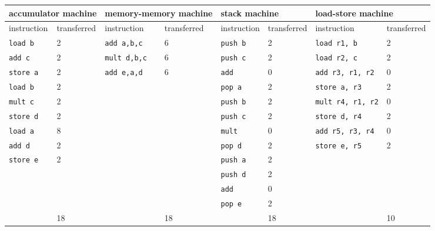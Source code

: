 \documentclass{article}
\begin{document}
\begin{tabular}{l|ll|ll|ll|l|}
\hline
\multicolumn{2}{|l|}{accumulator machine} & \multicolumn{2}{|l|}{memory-memory machine} & \multicolumn{2}{|l|}{stack machine} & \multicolumn{2}{|l|}{load-store machine} \\ \hline
\multicolumn{1}{|l|}{instruction} & transferred & \multicolumn{1}{|l|}{instruction} & transferred & \multicolumn{1}{|l|}{instruction} & transferred & \multicolumn{1}{|l|}{instruction} & transferred \\ \hline
\multicolumn{1}{|l|}{\texttt{load b}} & 2 & \multicolumn{1}{|l|}{\texttt{add a,b,c}} & 6 & \multicolumn{1}{|l|}{\texttt{push b}} & 2 &\multicolumn{1}{|l|}{\texttt{load r1, b}} & 2 \\ 
\multicolumn{1}{|l|}{\texttt{add c}} & 2 &\multicolumn{1}{|l|}{\texttt{mult d,b,c}} & 6 & \multicolumn{1}{|l|}{\texttt{push c}} & 2 & \multicolumn{1}{|l|}{\texttt{load r2, c}} & 2 \\
\multicolumn{1}{|l|}{\texttt{store a}} & 2 & \multicolumn{1}{|l|}{\texttt{add e,a,d}} & 6 & \multicolumn{1}{|l|}{\texttt{add}} & 0 & \multicolumn{1}{|l|}{\texttt{add r3, r1, r2}} & 0\\
\multicolumn{1}{|l|}{\texttt{load b}} & 2 & \multicolumn{1}{|l|}{} & & \multicolumn{1}{|l|}{\texttt{pop a}} & 2 & \multicolumn{1}{|l|}{\texttt{store a, r3}} & 2\\
\multicolumn{1}{|l|}{\texttt{mult c}} & 2 & \multicolumn{1}{|l|}{} & & \multicolumn{1}{|l|}{\texttt{push b}} & 2 & \multicolumn{1}{|l|}{\texttt{mult r4, r1, r2}} & 0 \\
\multicolumn{1}{|l|}{\texttt{store d}} & 2 & \multicolumn{1}{|l|}{} & &\multicolumn{1}{|l|}{\texttt{push c}} & 2 & \multicolumn{1}{|l|}{\texttt{store d, r4}} & 2\\ 
\multicolumn{1}{|l|}{\texttt{load a}} & 8 & \multicolumn{1}{|l|}{} & & \multicolumn{1}{|l|}{\texttt{mult}} & 0 & \multicolumn{1}{|l|}{\texttt{add r5, r3, r4}} & 0 \\
\multicolumn{1}{|l|}{\texttt{add d}} & 2 & \multicolumn{1}{|l|}{} & & \multicolumn{1}{|l|}{\texttt{pop d}} & 2 & \multicolumn{1}{|l|}{\texttt{store e, r5}} & 2\\
\multicolumn{1}{|l|}{\texttt{store e}} & 2 & \multicolumn{1}{|l|}{} & & \multicolumn{1}{|l|}{\texttt{push a}} & 2 & \multicolumn{1}{|l|}{} & \\
\multicolumn{1}{|l|}{} & & \multicolumn{1}{|l|}{} & & \multicolumn{1}{|l|}{\texttt{push d}} & 2 & \multicolumn{1}{|l|}{} & \\ 
\multicolumn{1}{|l|}{} & & \multicolumn{1}{|l|}{} & & \multicolumn{1}{|l|}{\texttt{add}} & 0 & \multicolumn{1}{|l|}{} &\\
\multicolumn{1}{|l|}{} & & \multicolumn{1}{|l|}{} & & \multicolumn{1}{|l|}{\texttt{pop e}} & 2 & \multicolumn{1}{|l|}{} &\\
\hline
 & \multicolumn{1}{|l|}{18} & & \multicolumn{1}{|l|}{18} & & \multicolumn{1}{|l|}{18} & & \multicolumn{1}{|l|}{10} \\
 \cline{2-2}\cline{4-4}\cline{6-6}\cline{8-8}
\end{tabular}
\end{document}
